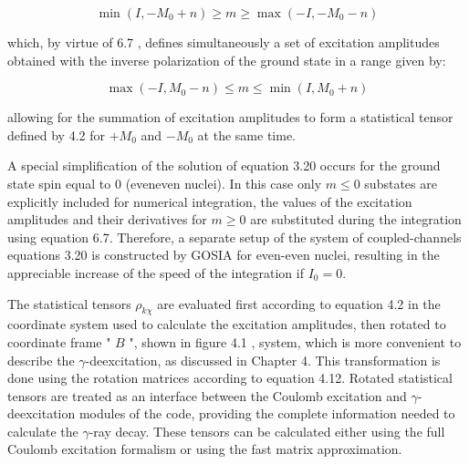 \documentclass[10pt]{article}
\begin{document}
\begin{equation*}
\min \left(I,-M_{0}+n\right) \geq m \geq \max \left(-I,-M_{0}-n\right) \tag{6.8}
\end{equation*}


which, by virtue of 6.7 , defines simultaneously a set of excitation amplitudes obtained with the inverse polarization of the ground state in a range given by:


\begin{equation*}
\max \left(-I, M_{0}-n\right) \leq m \leq \min \left(I, M_{0}+n\right) \tag{6.9}
\end{equation*}


allowing for the summation of excitation amplitudes to form a statistical tensor defined by 4.2 for $+M_{0}$ and $-M_{0}$ at the same time.

A special simplification of the solution of equation 3.20 occurs for the ground state spin equal to 0 (eveneven nuclei). In this case only $m \leq 0$ substates are explicitly included for numerical integration, the values of the excitation amplitudes and their derivatives for $m \geq 0$ are substituted during the integration using equation 6.7. Therefore, a separate setup of the system of coupled-channels equations 3.20 is constructed by GOSIA for even-even nuclei, resulting in the appreciable increase of the speed of the integration if $I_{0}=0$.

The statistical tensors $\rho_{k \chi}$ are evaluated first according to equation 4.2 in the coordinate system used to calculate the excitation amplitudes, then rotated to coordinate frame " $B$ ", shown in figure 4.1 , system, which is more convenient to describe the $\gamma$-deexcitation, as discussed in Chapter 4. This transformation is done using the rotation matrices according to equation 4.12. Rotated statistical tensors are treated as an interface between the Coulomb excitation and $\gamma$-deexcitation modules of the code, providing the complete information needed to calculate the $\gamma$-ray decay. These tensors can be calculated either using the full Coulomb excitation formalism or using the fast matrix approximation.
\end{document}
